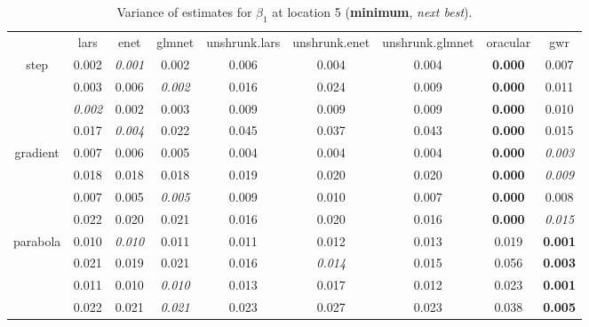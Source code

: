 \documentclass[authoryear, review, 11pt]{elsarticle}
\begin{document}
\begin{table}[ht]
\begin{center}
\begin{tabular}{ccccccccc}
  & lars & enet & glmnet & unshrunk.lars & unshrunk.enet & unshrunk.glmnet & oracular & gwr \\ 
  \cline{2-9}
  \multirow{4}{*}{step} & 0.002 & \emph{0.001} & 0.002 & 0.006 & 0.004 & 0.004 & \textbf{0.000} & 0.007 \\ 
  & 0.003 & 0.006 & \emph{0.002} & 0.016 & 0.024 & 0.009 & \textbf{0.000} & 0.011 \\ 
  & \emph{0.002} & 0.002 & 0.003 & 0.009 & 0.009 & 0.009 & \textbf{0.000} & 0.010 \\ 
  & 0.017 & \emph{0.004} & 0.022 & 0.045 & 0.037 & 0.043 & \textbf{0.000} & 0.015 \\ 
  \cline{2-9}
  \multirow{4}{*}{gradient} & 0.007 & 0.006 & 0.005 & 0.004 & 0.004 & 0.004 & \textbf{0.000} & \emph{0.003} \\ 
  & 0.018 & 0.018 & 0.018 & 0.019 & 0.020 & 0.020 & \textbf{0.000} & \emph{0.009} \\ 
  & 0.007 & 0.005 & \emph{0.005} & 0.009 & 0.010 & 0.007 & \textbf{0.000} & 0.008 \\ 
  & 0.022 & 0.020 & 0.021 & 0.016 & 0.020 & 0.016 & \textbf{0.000} & \emph{0.015} \\ 
  \cline{2-9}
  \multirow{4}{*}{parabola} & 0.010 & \emph{0.010} & 0.011 & 0.011 & 0.012 & 0.013 & 0.019 & \textbf{0.001} \\ 
  & 0.021 & 0.019 & 0.021 & 0.016 & \emph{0.014} & 0.015 & 0.056 & \textbf{0.003} \\ 
  & 0.011 & 0.010 & \emph{0.010} & 0.013 & 0.017 & 0.012 & 0.023 & \textbf{0.001} \\ 
  & 0.022 & 0.021 & \emph{0.021} & 0.023 & 0.027 & 0.023 & 0.038 & \textbf{0.005} \\ 
  \end{tabular}
\caption{Variance of estimates for $\beta_1$ at location 5 (\textbf{minimum}, \emph{next best}).\label{table:loc5-X1-varx}}
\end{center}
\end{table}
\end{document}
